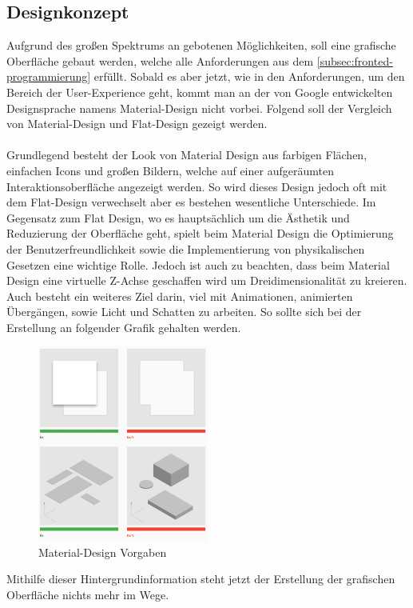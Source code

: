 \subsection{Designkonzept}
Aufgrund des großen Spektrums an gebotenen Möglichkeiten, soll eine grafische Oberfläche gebaut werden, welche alle Anforderungen aus dem \autoref{subsec:fronted-programmierung} erfüllt.
Sobald es aber jetzt, wie in den Anforderungen, um den Bereich der User-Experience geht, kommt man an der von Google entwickelten Designsprache namens Material-Design nicht vorbei.
Folgend soll der Vergleich von Material-Design und Flat-Design gezeigt werden.\\\\
Grundlegend besteht der Look von Material Design aus farbigen Flächen, einfachen Icons und großen Bildern, welche auf einer aufgeräumten Interaktionsoberfläche angezeigt werden.
So wird dieses Design jedoch oft mit dem Flat-Design verwechselt aber
es bestehen wesentliche Unterschiede.
Im Gegensatz zum Flat Design, wo es hauptsächlich um die Ästhetik und Reduzierung der Oberfläche geht, spielt beim Material Design die Optimierung der Benutzerfreundlichkeit sowie die Implementierung von physikalischen Gesetzen eine wichtige Rolle.
Jedoch ist auch zu beachten, dass beim Material Design eine virtuelle Z-Achse geschaffen wird um Dreidimensionalität zu kreieren.
Auch besteht ein weiteres Ziel darin, viel mit Animationen, animierten Übergängen, sowie Licht und Schatten zu arbeiten.
So sollte sich bei der Erstellung an folgender Grafik gehalten werden.
\begin{figure}[H]
\centering
\includegraphics[width=0.5\textwidth]{fig/ainf/material-design-rules.png}
\caption{Material-Design Vorgaben}
\label{rpiAndDisplay}
\end{figure}
Mithilfe dieser Hintergrundinformation steht jetzt der Erstellung der grafischen Oberfläche nichts mehr im Wege.
